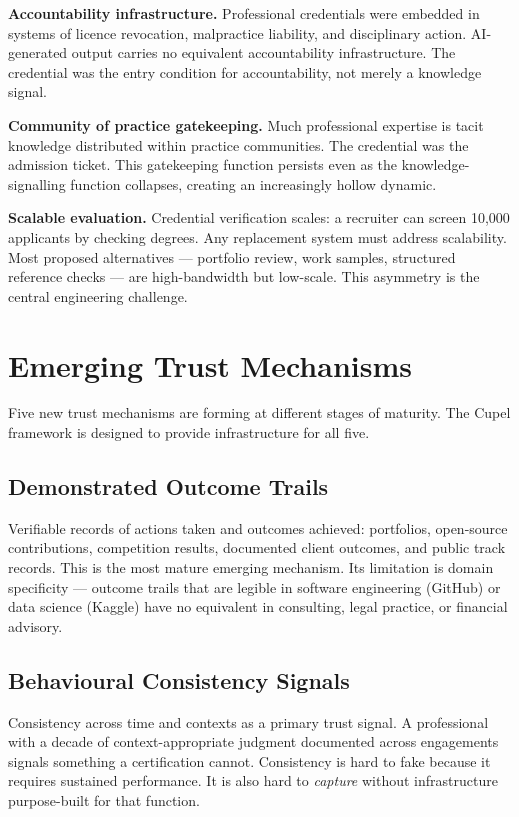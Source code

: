 \documentclass[11pt,a4paper]{article}
\begin{document}
\textbf{Accountability infrastructure.} Professional credentials were embedded in systems of licence
revocation, malpractice liability, and disciplinary action. AI-generated output carries no equivalent
accountability infrastructure. The credential was the entry condition for accountability, not merely
a knowledge signal.

\textbf{Community of practice gatekeeping.} Much professional expertise is tacit knowledge
distributed within practice communities. The credential was the admission ticket. This gatekeeping
function persists even as the knowledge-signalling function collapses, creating an increasingly
hollow dynamic.

\textbf{Scalable evaluation.} Credential verification scales: a recruiter can screen 10,000
applicants by checking degrees. Any replacement system must address scalability. Most proposed
alternatives — portfolio review, work samples, structured reference checks — are high-bandwidth
but low-scale. This asymmetry is the central engineering challenge.

\section{Emerging Trust Mechanisms}

Five new trust mechanisms are forming at different stages of maturity. The Cupel framework is
designed to provide infrastructure for all five.

\subsection{Demonstrated Outcome Trails}
Verifiable records of actions taken and outcomes achieved: portfolios, open-source contributions,
competition results, documented client outcomes, and public track records. This is the most mature
emerging mechanism. Its limitation is domain specificity — outcome trails that are legible in
software engineering (GitHub) or data science (Kaggle) have no equivalent in consulting,
legal practice, or financial advisory.

\subsection{Behavioural Consistency Signals}
Consistency across time and contexts as a primary trust signal. A professional with a decade of
context-appropriate judgment documented across engagements signals something a certification cannot.
Consistency is hard to fake because it requires sustained performance. It is also hard to
\emph{capture} without infrastructure purpose-built for that function.
\end{document}
